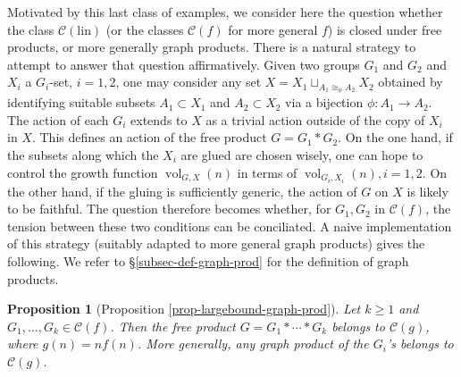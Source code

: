 \documentclass[11pt]{amsart}
\newcommand{\vol}{\ensuremath{\operatorname{vol}}}%
\newcommand{\Class}{\ensuremath{\mathcal{C}}}
\newcommand{\Clin}{\ensuremath{\mathcal{C}(\mathrm{lin})}}
\theoremstyle{definition}
\theoremstyle{plain}
\newtheorem{prop}[defin]{Proposition}
\newtheorem{prop-intro}[defin]{Proposition}
\theoremstyle{remark}
\begin{document}
 
Motivated by this last class of examples, we consider here the question whether the class $\Clin$ (or the classes $\Class(f)$ for more general $f$) is closed under free products, or more generally graph products.  There is a natural strategy to attempt to answer that question affirmatively. Given two groups $G_1$ and $G_2$ and $X_i$ a $G_i$-set, $i=1,2$, one may consider any set $X=X_1\sqcup_{A_1\cong_{\phi} A_2} X_2$ obtained by identifying suitable subsets $A_1 \subset X_1$ and $A_2 \subset X_2$ via a bijection $\phi\colon A_1\to A_2$. The action of each $G_i$ extends to $X$ as a trivial action outside of the copy of $X_i$ in $X$. This defines an action of the free product $G=G_1\ast G_2$. On the one hand, if the subsets along which the $X_i$ are glued are chosen wisely, one can hope to control the growth function $\vol_{G, X}(n)$ in terms of $\vol_{G_i, X_i}(n), i=1,2$. On the other hand, if the gluing is sufficiently generic, the action of $G$ on $X$ is likely to be faithful. The question therefore becomes whether, for $G_1, G_2$  in $\Class(f)$, the tension between these two conditions can be conciliated.  A naive implementation of this strategy (suitably adapted to more general graph products) gives the following. We refer to \S \ref{subsec-def-graph-prod} for the definition of graph products. 




 \begin{prop-intro}[Proposition \ref{prop-largebound-graph-prod}] \label{p-naive-bound}
Let $k\geq 1$ and $G_1,\ldots,G_k \in \Class(f)$. Then the free product $G=G_1\ast \cdots \ast G_k$ belongs to $\Class(g)$, where $g(n)  = n f(n)$. More generally, any graph product of the $G_i$'s belongs to $\Class(g)$. 
\end{prop-intro}
\end{document}
